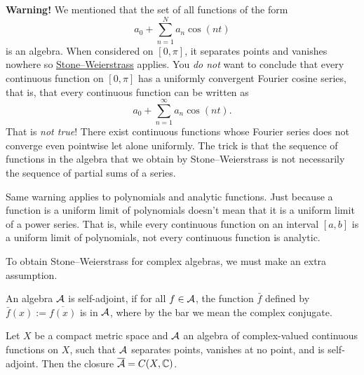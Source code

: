\textbf{Warning!}
We mentioned that the set of all functions of the form
\begin{equation*}
a_0 +
\sum_{n=1}^N a_n \cos(nt)
\end{equation*}
is an algebra.
When considered on $[0,\pi]$, 
it separates points and vanishes nowhere so
\hyperref[thm:SWreal]{Stone--Weierstrass} applies.
You \emph{do not} want to conclude that every continuous
function on $[0,\pi]$ has a uniformly convergent
Fourier cosine series, that is, that every continuous
function can be written as
\begin{equation*}
a_0 +
\sum_{n=1}^\infty a_n \cos(nt) .
\end{equation*}
That is \emph{not true}!
There exist continuous functions
whose Fourier series does not converge even pointwise
let alone uniformly.
The
trick is that the sequence of functions in the algebra that we obtain
by Stone--Weierstrass
is not necessarily the sequence of partial sums of a series.

Same warning applies to polynomials and analytic functions.
Just because a function is a
uniform limit of polynomials doesn't mean that it is a uniform limit of a
power series.  That is, while every continuous function on an interval
$[a,b]$ is a uniform limit of polynomials, not every continuous
function is analytic.

To obtain Stone--Weierstrass for complex algebras, we must
make an extra assumption.

\begin{defn}
An algebra ${\mathcal{A}}$ is self-adjoint, if for all $f \in {\mathcal{A}}$, the function
$\bar{f}$ defined by $\bar{f}(x) := \overline{f(x)}$ is in ${\mathcal{A}}$, where by the
bar we mean the complex conjugate.
\end{defn}

\begin{thm}
\label{thm:SWcomplex}
Let $X$ be a compact metric space and ${\mathcal{A}}$ an algebra of complex-valued
continuous functions on $X$, such that ${\mathcal{A}}$ separates points, vanishes at
no point, and is self-adjoint.  Then the closure $\overline{{\mathcal{A}}} = C(X,{\mathbb{C}})$.
\end{thm}


